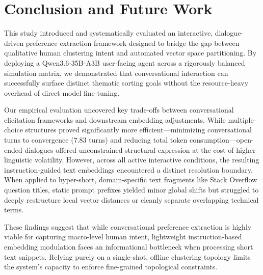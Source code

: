 \section{Conclusion and Future Work}
\label{sec:conclusion}

This study introduced and systematically evaluated an interactive, dialogue-driven preference extraction framework designed to bridge the gap between qualitative human clustering intent and automated vector space partitioning. By deploying a Qwen3.6-35B-A3B user-facing agent across a rigorously balanced simulation matrix, we demonstrated that conversational interaction can successfully surface distinct thematic sorting goals without the resource-heavy overhead of direct model fine-tuning.

Our empirical evaluation uncovered key trade-offs between conversational elicitation frameworks and downstream embedding adjustments. While multiple-choice structures proved significantly more efficient—minimizing conversational turns to convergence ($7.83$ turns) and reducing total token consumption—open-ended dialogues offered unconstrained structural expression at the cost of higher linguistic volatility. However, across all active interactive conditions, the resulting instruction-guided text embeddings encountered a distinct resolution boundary. When applied to hyper-short, domain-specific text fragments like Stack Overflow question titles, static prompt prefixes yielded minor global shifts but struggled to deeply restructure local vector distances or cleanly separate overlapping technical terms. 

These findings suggest that while conversational preference extraction is highly viable for capturing macro-level human intent, lightweight instruction-based embedding modulation faces an informational bottleneck when processing short text snippets. Relying purely on a single-shot, offline clustering topology limits the system's capacity to enforce fine-grained topological constraints.

